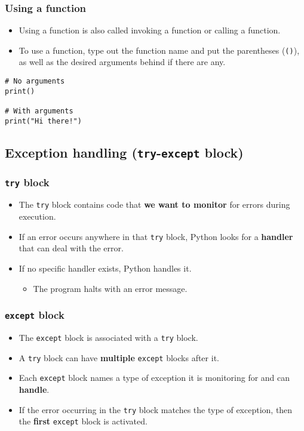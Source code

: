 \documentclass[11pt]{article}
\begin{document}
\subsubsection{Using a function}
\label{sec:org83803e4}
\begin{itemize}
\item Using a function is also called invoking a function or calling a function.
\item To use a function, type out the function name and put the parentheses (\texttt{()}), as well as the desired arguments behind if there are any.
\end{itemize}

\begin{verbatim}
# No arguments
print()

# With arguments
print("Hi there!")
\end{verbatim}

 \newpage

\subsection{Exception handling (\texttt{try}-\texttt{except} block)}
\label{sec:orge23df89}

\subsubsection{\texttt{try} block}
\label{sec:orgeded3c7}
\begin{itemize}
\item The \texttt{try} block contains code that \textbf{we want to monitor} for errors during execution.
\item If an error occurs anywhere in that \texttt{try} block, Python looks for a \textbf{handler} that can deal with the error.
\item If no specific handler exists, Python handles it.
\begin{itemize}
\item The program halts with an error message.
\end{itemize}
\end{itemize}

\subsubsection{\texttt{except} block}
\label{sec:org45be527}
\begin{itemize}
\item The \texttt{except} block is associated with a \texttt{try} block.
\item A \texttt{try} block can have \textbf{multiple} \texttt{except} blocks after it.
\item Each \texttt{except} block names a type of exception it is monitoring for and can \textbf{handle}.
\item If the error occurring in the \texttt{try} block matches the type of exception, then the \textbf{first} \texttt{except} block is activated.
\end{itemize}
\end{document}
